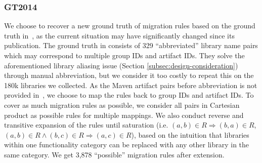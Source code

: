 \documentclass[conference, 10pt]{IEEEtran}
\begin{document}
\subsubsection{GT2014}
We choose to recover a new ground truth of migration rules based on the ground truth in~\cite{2014JournalOfSysAndSoft-Teyton-Study}, as the current situation may have significantly changed since its publication.
The ground truth in \cite{2014JournalOfSysAndSoft-Teyton-Study} consists of 329 ``abbreviated'' library name pairs which may correspond to multiple group IDs and artifact IDs. 
They solve the aforementioned library aliasing issue (Section \ref{subsec:design-consideration}) through manual abbreviation, but we consider it too costly to repeat this on the 180k libraries we collected. 
As the Maven artifact pairs before abbreviation is not provided in~\cite{2014JournalOfSysAndSoft-Teyton-Study}, we choose to map the rules back to group IDs and artifact IDs. 
To cover as much migration rules as possible, we consider all pairs in Cartesian product as possible rules for multiple mappings.
We also conduct reverse and transitive expansion of the rules until saturation (i.e. $(a,b)\in R \Rightarrow (b,a) \in R$, $(a,b)\in R \land (b,c)\in R \Rightarrow (a,c)\in R$), based on the intuition that libraries within one functionality category can be replaced with any  other library in the same category. We get 3,878 ``possible'' migration rules after extension.
\end{document}
